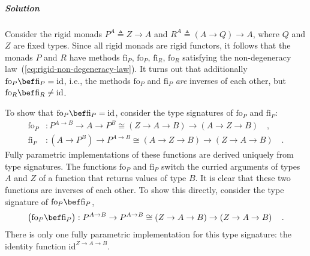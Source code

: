 \subparagraph{Solution}

Consider the rigid monads $P^{A}\triangleq Z\rightarrow A$ and $R^{A}\triangleq\left(A\rightarrow Q\right)\rightarrow A$,
where $Q$ and $Z$ are fixed types. Since all rigid monads are rigid
functors, it follows that the monads $P$ and $R$ have methods $\text{fi}_{P}$,
$\text{fo}_{P}$, $\text{fi}_{R}$, $\text{fo}_{R}$ satisfying the
non-degeneracy law~(\ref{eq:rigid-non-degeneracy-law}). It turns
out that additionally $\text{fo}_{P}\bef\text{fi}_{P}=\text{id}$,
i.e., the methods $\text{fo}_{P}$ and $\text{fi}_{P}$ \emph{are}
inverses of each other, but $\text{fo}_{R}\bef\text{fi}_{R}\neq\text{id}$.

To show that $\text{fo}_{P}\bef\text{fi}_{P}=\text{id}$, consider
the type signatures of $\text{fo}_{P}$ and $\text{fi}_{P}$:
\begin{align*}
\text{fo}_{P} & :P^{A\rightarrow B}\rightarrow A\rightarrow P^{B}\cong\left(Z\rightarrow A\rightarrow B\right)\rightarrow\left(A\rightarrow Z\rightarrow B\right)\quad,\\
\text{fi}_{P} & :(A\rightarrow P^{B})\rightarrow P^{A\rightarrow B}\cong\left(A\rightarrow Z\rightarrow B\right)\rightarrow\left(Z\rightarrow A\rightarrow B\right)\quad.
\end{align*}
Fully parametric implementations of these functions are derived uniquely
from type signatures. The functions $\text{fo}_{P}$ and $\text{fi}_{P}$
switch the curried arguments of types $A$ and $Z$ of a function
that returns values of type $B$. It is clear that these two functions
are inverses of each other. To show this directly, consider the type
signature of $\text{fo}_{P}\bef\text{fi}_{P}$,
\[
\big(\text{fo}_{P}\bef\text{fi}_{P}\big):P^{A\rightarrow B}\rightarrow P^{A\rightarrow B}\cong\left(Z\rightarrow A\rightarrow B\right)\rightarrow\left(Z\rightarrow A\rightarrow B\right)\quad.
\]
There is only one fully parametric implementation for this type signature:
the identity function $\text{id}^{Z\rightarrow A\rightarrow B}$.

